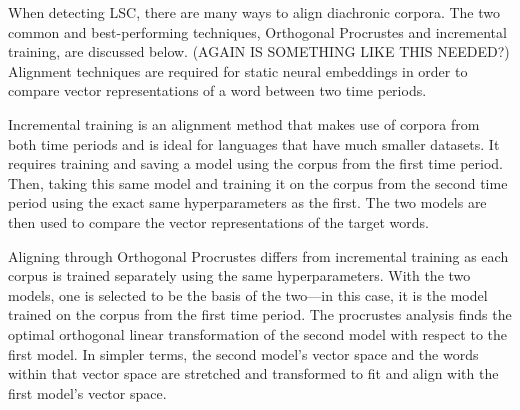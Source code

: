 When detecting LSC, there are many ways to align diachronic corpora. The two common and best-performing techniques, Orthogonal Procrustes and incremental training, are discussed below. (AGAIN IS SOMETHING LIKE THIS NEEDED?) Alignment techniques are required for static neural embeddings in order to compare vector representations of a word between two time periods. 

Incremental training is an alignment method that makes use of corpora from both time periods and is ideal for languages that have much smaller datasets. It requires training and saving a model using the corpus from the first time period. Then, taking this same model and training it on the corpus from the second time period using the exact same hyperparameters as the first. The two models are then used to compare the vector representations of the target words. 

Aligning through Orthogonal Procrustes differs from incremental training as each corpus is trained separately using the same hyperparameters. With the two models, one is selected to be the basis of the two—in this case, it is the model trained on the corpus from the first time period. The procrustes analysis finds the optimal orthogonal linear transformation of the second model with respect to the first model. In simpler terms, the second model’s vector space and the words within that vector space are stretched and transformed to fit and align with the first model’s vector space.